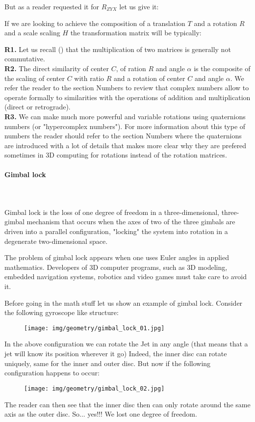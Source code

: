 	But as a reader requested it for $R_{ZYX}$ let us give it:
	
	
	If we are looking to achieve the composition of a translation $T$ and a rotation $R$ and a scale scaling $H$ the transformation matrix will be typically:
	
	\begin{tcolorbox}[title=Remarks,colframe=black,arc=10pt]
	\textbf{R1.} Let us recall () that the multiplication of two matrices is generally not commutative.\\
	
	\textbf{R2.} The direct similarity of center $C$, of ration $R$ and angle $\alpha$ is the composite of the scaling of center $C$ with ratio $R$ and a rotation of center $C$ and angle $\alpha$. We refer the reader to the section Numbers to review that complex numbers allow to operate formally to similarities with the operations of addition and multiplication (direct or retrograde).\\
	
	\textbf{R3.} We can make much more powerful and variable rotations using quaternions numbers (or "hypercomplex numbers"). For more information about this type of numbers the reader should refer to the section Numbers where the quaternions are introduced with a lot of details that makes more clear why they are prefered sometimes in 3D computing for rotations instead of the rotation matrices.
	\end{tcolorbox}
	
	\paragraph{Gimbal lock}\mbox{}\\\\
	Gimbal lock is the loss of one degree of freedom in a three-dimensional, three-gimbal mechanism that occurs when the axes of two of the three gimbals are driven into a parallel configuration, "locking" the system into rotation in a degenerate two-dimensional space.
	
	The problem of gimbal lock appears when one uses Euler angles in applied mathematics. Developers of 3D computer programs, such as 3D modeling, embedded navigation systems, robotics and video games must take care to avoid it.
	
	Before going in the math stuff let us show an example of gimbal lock. Consider the following gyroscope like structure:
	\begin{figure}[H]
		\centering
		\texttt{[image: img/geometry/gimbal\_lock\_01.jpg]}
	\end{figure}
	In the above configuration we can rotate the Jet in any angle (that means that a jet will know its position wherever it go) Indeed, the inner disc can rotate uniquely, same for the inner and outer disc. But now if the following configuration happens to occur:
	\begin{figure}[H]
		\centering
		\texttt{[image: img/geometry/gimbal\_lock\_02.jpg]}
	\end{figure}
	The reader can then see that the inner disc then can only rotate around the same axis as the outer disc. So... yes!!! We lost one degree of freedom.
	
